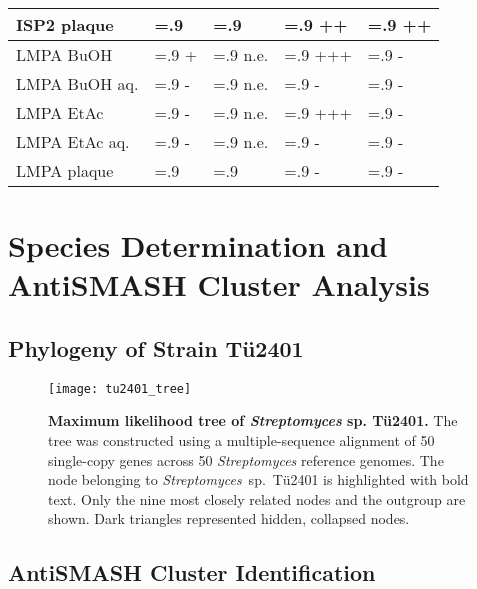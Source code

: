 \begin{table}[htbp]
\begin{tabularx}{\textwidth}{>{\hsize=1.4\hsize}X>{\hsize=.9\hsize}X>{\hsize=.9\hsize}X>{\hsize=.9\hsize}X>{\hsize=.9\hsize}X}
            ISP2 plaque     &       &       & ++    & ++   \\
            \midrule
            LMPA BuOH       & +     & n.e.  & +++   & -    \\
            LMPA BuOH aq.   & -     & n.e.  & -     & -    \\
            LMPA EtAc       & -     & n.e.  & +++   & -    \\
            LMPA EtAc aq.   & -     & n.e.  & -     & -    \\
            LMPA plaque     &       &       & -     & -    \\
            \bottomrule
        \end{tabularx}
    \end{table}


\section{Species Determination and AntiSMASH Cluster Analysis} %
\label{sec:species_antismash}

    \subsection{Phylogeny of Strain Tü2401} %
    \label{sub:phylogeny_of_strain_tue2401}

	\begin{figure}[htbp]
		\texttt{[image: tu2401\_tree]}
		\caption[Maximum likelihood tree of \emph{Streptomyces} sp. Tü2401.]{%
			\textbf{Maximum likelihood tree of \emph{Streptomyces} sp. Tü2401.}
			The tree was constructed using a multiple-sequence alignment of 50 single-copy genes across 50 \textit{Streptomyces} reference genomes.
			The node belonging to \textit{Streptomyces}~sp.~Tü2401 is highlighted with bold text.
			Only the nine most closely related nodes and the outgroup are shown.
			Dark triangles represented hidden, collapsed nodes.}
		\label{fig:phylo_tree} 
	\end{figure}


    \subsection{AntiSMASH Cluster Identification} %
    \label{sub:antismash_cluster_identification}

